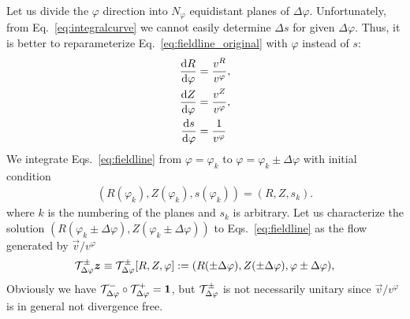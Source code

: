 Let us divide the $\varphi$ direction into $N_\varphi$ equidistant planes of
$\Delta \varphi$. Unfortunately, from Eq.~\eqref{eq:integralcurve} we cannot easily determine
$\Delta s$ for given $\Delta \varphi$.
Thus, it is better to reparameterize Eq.~\eqref{eq:fieldline_original} with $\varphi$ instead of $s$:
\begin{subequations}
\begin{align}
    \frac{\d R}{\d\varphi}&= \frac{v^R}{v^\varphi},\\ %
    \frac{\d Z}{\d\varphi}&=\frac{v^Z}{v^\varphi},\\%
    \frac{\d s}{\d\varphi}&=\frac{1}{v^\varphi}
\end{align}
\label{eq:fieldline}
\end{subequations}
We integrate Eqs.~\eqref{eq:fieldline} from $\varphi=\varphi_k$ to $\varphi=\varphi_k\pm \Delta \varphi$
with initial condition
\begin{align}
    (R(\varphi_k), Z(\varphi_k), s(\varphi_k) ) = (R, Z, s_k).
    \label{}
\end{align}
where $k$ is the numbering of the planes and $s_k$ is arbitrary.
Let us characterize the solution $(R(\varphi_k\pm \Delta \varphi), Z(\varphi_k\pm \Delta \varphi))$ to Eqs.~\eqref{eq:fieldline} as the flow generated by $\vec v/v^\varphi$
\begin{align}
    \mathcal T^\pm_{\Delta\varphi}{\boldsymbol{z}} \equiv \mathcal T^\pm_{\Delta\varphi}[R, Z, \varphi]:= ( R(\pm \Delta\varphi), Z( \pm \Delta\varphi), \varphi\pm\Delta \varphi),
    \label{}
\end{align}
Obviously we have $\mathcal T^-_{\Delta\varphi}\circ\mathcal T^+_{\Delta\varphi} = \mathbf{1}$, but $\mathcal T^\pm_{\Delta\varphi}$ is not necessarily unitary since $\vec v/v^\varphi$ is in general
not divergence free.

